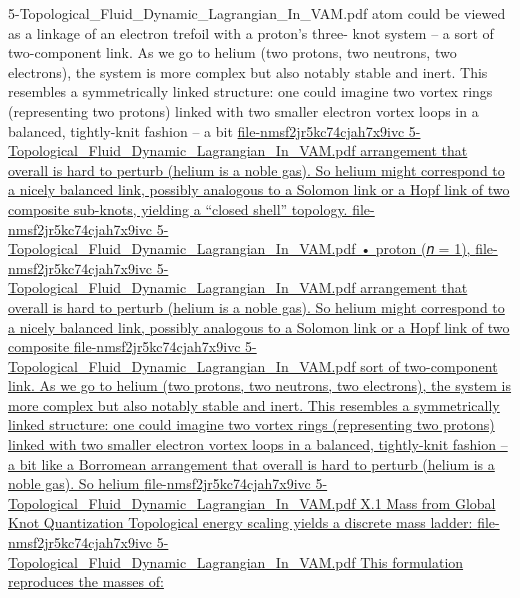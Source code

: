 {5-Topological_Fluid_Dynamic_Lagrangian_In_VAM.pdf
atom could be viewed as a linkage of an electron trefoil with a proton’s three- knot system – a sort of two-component link. As we go to helium (two protons, two neutrons, two electrons), the system is more complex but also notably stable and inert. This resembles a symmetrically linked structure: one could imagine two vortex rings (representing two protons) linked with two smaller electron vortex loops in a balanced, tightly-knit fashion – a bit
}\href{file://xn--file-nmsf2jr5kc74cjah7x9ivc%23:~:text=arrangement%20that%20overall%20is%20hard,yielding%20a%20closed%20shell%20topology-y060f4d/}{file-nmsf2jr5kc74cjah7x9ivc
5-Topological_Fluid_Dynamic_Lagrangian_In_VAM.pdf
arrangement that overall is hard to perturb (helium is a noble gas). So helium might correspond to a nicely balanced link, possibly analogous to a Solomon link or a Hopf link of two composite sub-knots, yielding a “closed shell” topology.
}\href{file://xn--file-nmsf2jr5kc74cjah7x9ivc%23:~:text=%20proton%20-bg15a/}{file-nmsf2jr5kc74cjah7x9ivc
5-Topological_Fluid_Dynamic_Lagrangian_In_VAM.pdf
• proton (𝑛 = 1),
}\href{file://file-nmsf2jr5kc74cjah7x9ivc%23:~:text=arrangement%20that%20overall%20is%20hard,hopf%20link%20of%20two%20composite/}{file-nmsf2jr5kc74cjah7x9ivc
5-Topological_Fluid_Dynamic_Lagrangian_In_VAM.pdf
arrangement that overall is hard to perturb (helium is a noble gas). So helium might correspond to a nicely balanced link, possibly analogous to a Solomon link or a Hopf link of two composite
}\href{file://file-nmsf2jr5kc74cjah7x9ivc%23:~:text=sort%20of%20two,so%20helium/}{file-nmsf2jr5kc74cjah7x9ivc
5-Topological_Fluid_Dynamic_Lagrangian_In_VAM.pdf
sort of two-component link. As we go to helium (two protons, two neutrons, two electrons), the system is more complex but also notably stable and inert. This resembles a symmetrically linked structure: one could imagine two vortex rings (representing two protons) linked with two smaller electron vortex loops in a balanced, tightly-knit fashion – a bit like a Borromean arrangement that overall is hard to perturb (helium is a noble gas). So helium
}\href{file://file-nmsf2jr5kc74cjah7x9ivc%23:~:text=x,yields%20a%20discrete%20mass%20ladder/}{file-nmsf2jr5kc74cjah7x9ivc
5-Topological_Fluid_Dynamic_Lagrangian_In_VAM.pdf
X.1 Mass from Global Knot Quantization Topological energy scaling yields a discrete mass ladder:
}\href{file://file-nmsf2jr5kc74cjah7x9ivc%23:~:text=this%20formulation%20reproduces%20the%20masses,of/}{file-nmsf2jr5kc74cjah7x9ivc
5-Topological_Fluid_Dynamic_Lagrangian_In_VAM.pdf
This formulation reproduces the masses of:
}
